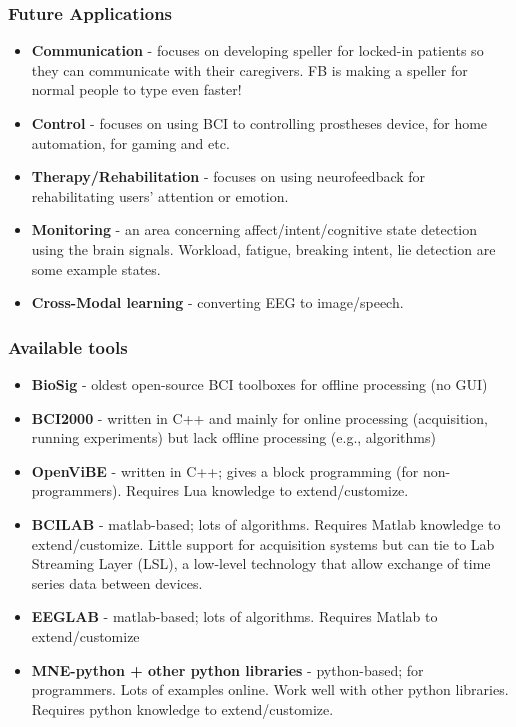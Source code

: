 \documentclass{beamer}
\begin{document}
\begin{frame}
\frametitle{Future Applications}
\begin{itemize}
\item \textbf{Communication} - focuses on developing speller for locked-in patients so they can communicate with their caregivers.  FB is making a speller for normal people to type even faster!
\item \textbf{Control} - focuses on using BCI to controlling prostheses device, for home automation, for gaming and etc.
\item \textbf{Therapy/Rehabilitation} - focuses on using neurofeedback for rehabilitating users' attention or emotion. 
\item \textbf{Monitoring} - an area concerning affect/intent/cognitive state detection using the brain signals.  Workload, fatigue, breaking intent, lie detection are some example states. 
\item \textbf{Cross-Modal learning} - converting EEG to image/speech.  
\end{itemize}
\end{frame}

\begin{frame}
\footnotesize
\frametitle{Available tools}
\begin{itemize}
	\item \textbf{BioSig} - oldest open-source BCI toolboxes for offline processing (no GUI)
	\item \textbf{BCI2000} - written in C++ and mainly for online processing (acquisition, running experiments) but lack offline processing (e.g., algorithms)
	\item \textbf{OpenViBE} - written in C++;  gives a block programming (for non-programmers).  Requires Lua knowledge to extend/customize.
	\item \textbf{BCILAB} - matlab-based; lots of algorithms.  Requires Matlab knowledge to extend/customize.  Little support for acquisition systems but can tie to Lab Streaming Layer (LSL), a low-level technology that allow exchange of time series data between devices.
	\item \textbf{EEGLAB} - matlab-based; lots of algorithms.   Requires Matlab to extend/customize
	\item \textbf{MNE-python + other python libraries} - python-based; for programmers.  Lots of examples online.  Work well with other python libraries.  Requires python knowledge to extend/customize. 
\end{itemize}
\end{frame}
\end{document}
